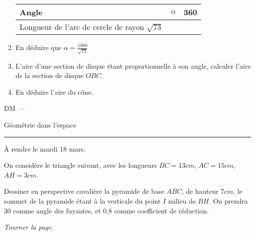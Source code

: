 \documentclass[11pt]{article}
\begin{document}
\begin{exercice}
\begin{enumerate}
      \begin{center}
      \begin{tabular}{p{10em}||c|c}
        Angle & $\alpha$ & 360 \\
        \hline
        Longueur de l'arc de cercle de rayon $\sqrt{73}$ & & \\
      \end{tabular}
    \end{center}
    \item En déduire que $\alpha=\frac{1080}{\sqrt{73}}$
    \item L'aire d'une section de disque étant proportionnelle à son angle, calculer l'aire de la section de disque $OBC$.
    \item En déduire l'aire du cône.
  \end{enumerate}
\end{exercice}

\newpage

\setcounter{exercice}{0}
\begin{center}
  \textsc{DM}
  ---
  {
    \Large
    Géométrie dans l'espace

    \hrule
  }
\end{center}

\begin{em}
  À rendre le mardi 18 mars.
\end{em}

\begin{exercice}
  On considère le triangle suivant, avec les longueurs $BC=13cm$, $AC=15cm$, $AH=3cm$.


    Dessiner en perspective cavalière la pyramide de base $ABC$, de hauteur $7cm$, le sommet de la pyramide étant à la verticale du point $I$ milieu de $BH$. On prendra 30 comme angle des fuyantes, et 0,8 comme coefficient de réduction.
\end{exercice}

\hfill\emph{Tourner la page.}
\newpage
\end{document}
